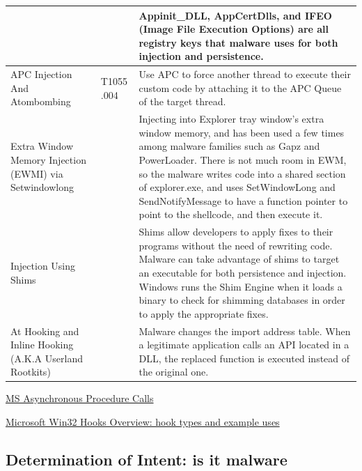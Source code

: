 \documentclass{article}
\begin{document}
\begin{table}[!ht]
\begin{tabular}{ |p{3.5cm}||p{1.2cm}|p{10cm}|  }
        &
             & Appinit\_DLL, AppCertDlls, and IFEO (Image File Execution Options) are all registry keys that
               malware uses for both injection and persistence. \\
  \hline
  APC Injection And Atombombing
        & T1055 .004
             & Use APC to force another thread to execute their custom code by attaching it to the APC
               Queue of the target thread. \\
  \hline
  Extra Window Memory Injection (EWMI) via Setwindowlong
        &
             & Injecting into Explorer tray window’s extra window memory, and has been used a few times
               among malware families such as Gapz and PowerLoader. There is not much room in EWM, so the
               malware writes code into a shared section of explorer.exe, and uses SetWindowLong and
               SendNotifyMessage to have a function pointer to point to the shellcode, and then execute it. \\
  \hline
  Injection Using Shims
        &
             & Shims allow developers to apply fixes to their programs without the need of rewriting code.
               Malware can take advantage of shims to target an executable for both persistence and injection.
               Windows runs the Shim Engine when it loads a binary to check for shimming databases in order
              to apply the appropriate fixes. \\
  \hline
  At Hooking and Inline Hooking (A.K.A Userland Rootkits)
        &
            & Malware changes the import address table. When a legitimate application calls an API located
              in a DLL, the replaced function is executed instead of the original one. \\

  \hline
\end{tabular}
\label{table: ProcessInjectionTechniques}
\end{table}

\pagebreak

\href{https://learn.microsoft.com/en-gb/windows/win32/sync/asynchronous-procedure-calls}{MS Asynchronous Procedure Calls}

\href{https://learn.microsoft.com/en-gb/windows/win32/winmsg/about-hooks}{Microsoft Win32 Hooks Overview: hook types and example uses}

\subsection{Determination of Intent: is it malware}
\end{document}
